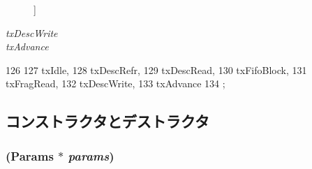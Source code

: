 \begin{Desc}
\begin{description}
{}]\item[{\em 
\hypertarget{classNSGigE_a96f29317c7f6628ea6a0c1bc5ab05d6aa872ea176d9998a047c571c02180db497}{
txDescWrite}
\label{classNSGigE_a96f29317c7f6628ea6a0c1bc5ab05d6aa872ea176d9998a047c571c02180db497}
}]\item[{\em 
\hypertarget{classNSGigE_a96f29317c7f6628ea6a0c1bc5ab05d6aab3abea2e2935fe79964a81ddb6a15b75}{
txAdvance}
\label{classNSGigE_a96f29317c7f6628ea6a0c1bc5ab05d6aab3abea2e2935fe79964a81ddb6a15b75}
}]\end{description}
\end{Desc}




\begin{DoxyCode}
126     {
127         txIdle,
128         txDescRefr,
129         txDescRead,
130         txFifoBlock,
131         txFragRead,
132         txDescWrite,
133         txAdvance
134     };
\end{DoxyCode}


\subsection{コンストラクタとデストラクタ}
\hypertarget{classNSGigE_a13f27d8f13473f650bc05ab0f2c3bcfe}{
\subsubsection[{NSGigE}]{ ({\bf Params} $\ast$ {\em params})}}
\label{classNSGigE_a13f27d8f13473f650bc05ab0f2c3bcfe}



